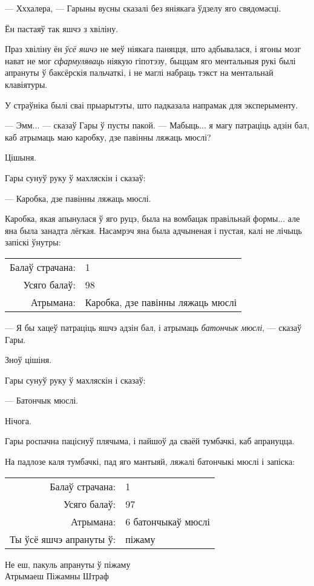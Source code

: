 --- Хххалера, --- Гарыны вусны сказалі без яніякага ўдзелу яго свядомасці.

Ён пастаяў так яшчэ з хвіліну.

Праз хвіліну ён \emph{ўсё яшчэ} 
не меў ніякага паняцця, што адбывалася, і ягоны мозг нават 
не мог \emph{сфармуляваць} ніякую гіпотэзу, быццам яго ментальныя рукі  
былі апрануты ў баксёрскія пальчаткі, і не маглі набраць тэкст на 
ментальнай клавіятуры. 

У страўніка былі сваі прыарытэты, што падказала напрамак для эксперыменту.

--- Эмм... --- сказаў Гары ў пусты пакой. --- Мабыць... я магу патраціць адзін 
бал, каб атрымаць маю каробку, дзе павінны ляжаць мюслі?

Цішыня.

Гары сунуў руку ў махляскін і сказаў: 

--- Каробка, дзе павінны ляжаць мюслі.

Каробка, якая апынулася ў яго руцэ, была на вомбацак правільнай формы... але яна была
занадта лёгкая. Насамрэч яна была адчыненая і пустая, калі не лічыць запіскі ўнутры:

\begin{writtenNoteGame}
\begin{tabular}{rl}
Балаў страчана: & 1\\
Усяго балаў: & 98\\
Атрымана: & Каробка, дзе павінны ляжаць мюслі
\end{tabular}
\end{writtenNoteGame}

--- Я бы хацеў патраціць яшчэ адзін бал, і атрымаць \emph{батончык мюслі}, 
--- сказаў Гары.

Зноў цішіня. 

Гары сунуў руку ў махляскін і сказаў:

--- Батончык мюслі.

Нічога.

Гары роспачна паціснуў плячыма, і пайшоў да сваёй тумбачкі, каб апрануцца.

На падлозе каля тумбачкі, пад яго мантыяй, ляжалі батончыкі мюслі і запіска:

\begin{writtenNoteGame}
\begin{tabular}{rl}
Балаў страчана: & 1\\
Усяго балаў: & 97\\
Атрымана: & 6 батончыкаў мюслі\\
Ты ўсё яшчэ апрануты ў: & піжаму\\
\end{tabular}

Не еш, пакуль апрануты ў піжаму\\
Атрымаеш Піжамны Штраф
\end{writtenNoteGame}


